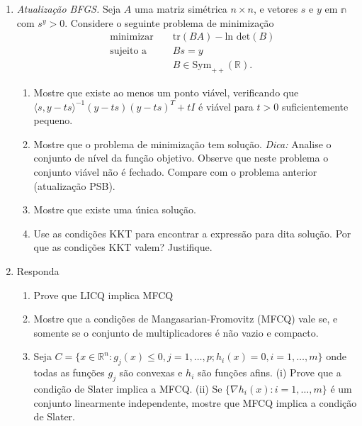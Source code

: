 \documentclass[a4paper,latin]{article}
\begin{document}
\begin{enumerate}
\begin{enumerate}
      \end{enumerate}
    \item {\it Atualização BFGS.}  Seja $A$ uma matriz simétrica $n \times n$, e vetores $s$ e $y$
    em $\mathbb{n}$ com 
    $s^{y}>0$.
    Considere o seguinte problema de minimização
     \begin{equation*}
    \begin{aligned}
    & \text{ minimizar }
    & & \text{tr}(BA)- \text{ln det}(B) \\
    & \text{ sujeito a }
    & & Bs=y \\
    &
    & & B \in \text{Sym}_{++}(\mathbb{R}).
    \end{aligned}
    \end{equation*}
      \begin{enumerate}
    	\item Mostre que existe ao menos um ponto viável, verificando que 
    	$\langle s, y-ts\rangle^{-1}(y-ts)(y-ts)^{T}+tI$ é viável para $t>0$ suficientemente pequeno.
    	\item Mostre que o problema de minimização tem solução.
    	{\it Dica:}
    	Analise o conjunto de nível da função objetivo.
    	Observe que neste problema o conjunto viável não é fechado. 
    	Compare com o problema anterior (atualização PSB).
    	\item Mostre que existe uma única solução. 
    	\item
    	Use as condições KKT para encontrar a expressão para dita solução. 
    	Por que as condições KKT valem? Justifique.
     \end{enumerate}	
    \item Responda 
      \begin{enumerate}
      	\item Prove que LICQ implica MFCQ 
      	\item Mostre que a condições de Mangasarian-Fromovitz (MFCQ) vale se, e somente se 
    o conjunto de multiplicadores é não vazio e compacto.
       \item Seja $C=\{x \in \mathbb{R}^n: g_j(x)\leq 0, j=1,\dots,p; 
       h_{i}(x)=0, i=1,\dots, m\}$ onde todas as funções $g_j$ são convexas
       e $h_{i}$ são funções afins. (i) Prove que 
   a condição de Slater implica a MFCQ. (ii) Se 
   $\{\nabla h_{i}(x): i=1,\dots, m\}$
   é um conjunto linearmente independente, mostre que MFCQ implica a condição de Slater.

\end{enumerate}
\end{enumerate}
\end{document}
